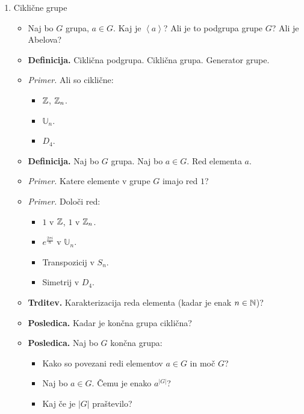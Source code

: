\begin{enumerate}
    \newpage
    \item Ciklične grupe
    \begin{itemize}
        \item Naj bo $G$ grupa, $a \in G$. Kaj je $\left\langle a \right\rangle $? Ali je to podgrupa grupe $G$? Ali je Abelova?
        \item \colorbox{purple!30}{\textbf{Definicija.}} Ciklična podgrupa. Ciklična grupa. Generator grupe.
        \item \colorbox{yellow!30}{\emph{Primer.}} Ali so ciklične: 
        \begin{itemize}
            \item $\mathbb{Z}$, $\mathbb{Z}_n$.
            \item $\mathbb{U}_n$.
            \item $D_4$.
        \end{itemize}
        \item \colorbox{purple!30}{\textbf{Definicija.}} Naj bo $G$ grupa. Naj bo $a \in G$. Red elementa $a$.
        \item \colorbox{yellow!30}{\emph{Primer.}} Katere elemente v grupe $G$ imajo red $1$?
        \item \colorbox{yellow!30}{\emph{Primer.}} Določi red:
        \begin{itemize}
            \item $1$ v $\mathbb{Z}$, $1$ v $\mathbb{Z}_n$.
            \item $e^{\frac{2 \pi i}{n}}$ v $\mathbb{U}_n$.
            \item Transpozicij v $S_n$.
            \item Simetrij v $D_4$.
        \end{itemize}
        \item \colorbox{blue!30}{\textbf{Trditev.}} Karakterizacija reda elementa (kadar je enak $n \in \mathbb{N}$)?
        \item \colorbox{orange!30}{\textbf{Posledica.}} Kadar je končna grupa ciklična?
        \item \colorbox{orange!30}{\textbf{Posledica.}} Naj bo $G$ končna grupa:
        \begin{itemize}
            \item Kako so povezani redi elementov $a \in G$ in moč $G$?
            \item Naj bo $a \in G$. Čemu je enako $a^{|G|}$?
            \item Kaj če je $|G|$ praštevilo?
        \end{itemize}        
    \end{itemize}


\end{enumerate}
